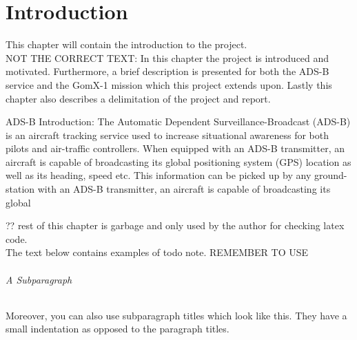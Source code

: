 \chapter{Introduction}\label{ch:introduction}
This chapter will contain the introduction to the project.\\

NOT THE CORRECT TEXT:
In this chapter the project is introduced and motivated. Furthermore, a brief description is presented for both the ADS-B service and the GomX-1 mission which this project extends upon. Lastly this chapter also describes a delimitation of the project and report.

ADS-B Introduction:
The Automatic Dependent Surveillance-Broadcast (ADS-B) is an aircraft tracking service used to increase situational  awareness for both pilots and air-traffic controllers. When equipped with an ADS-B transmitter, an aircraft is capable of broadcasting its global positioning system (GPS) location as well as its heading, speed etc. This information can be picked up by any ground-station with an ADS-B transmitter, an aircraft is capable of broadcasting its global 

?? rest of this chapter is garbage and only used by the author for checking latex code.\\
The text below contains examples of todo note. REMEMBER TO USE 

\subparagraph{A Subparagraph} Moreover, you can also use subparagraph titles which look like this. They have a small indentation as opposed to the paragraph titles.


